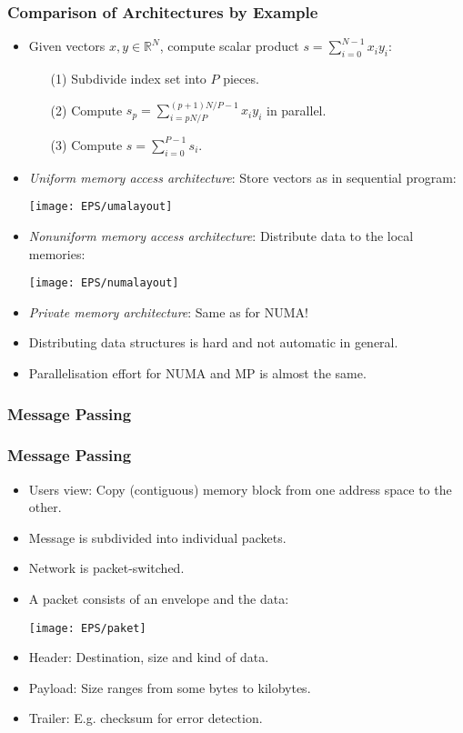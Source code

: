 \begin{frame}
\frametitle{Comparison of Architectures by Example}
\begin{itemize}
\item Given vectors $x,y\in\mathbb{R}^N$, compute scalar product $s =
  \sum_{i=0}^{N-1} x_i y_i$:
\begin{itemize}
\item[(1)] Subdivide index set into $P$ pieces.
\item[(2)] Compute $s_p=\sum_{i=pN/P}^{(p+1)N/P-1} x_i y_i$ in
  parallel.
\item[(3)] Compute $s = \sum_{i=0}^{P-1} s_i$.
\end{itemize}
\item \textit{Uniform memory access architecture}: Store vectors as in
  sequential program:
\begin{center}
  \texttt{[image: EPS/umalayout]}
\end{center}
\item \textit{Nonuniform memory access architecture}: Distribute
  data to the local memories:
\begin{center}
  \texttt{[image: EPS/numalayout]}
\end{center}
\item \textit{Private memory architecture}: Same as for NUMA!
\item Distributing data structures is hard and not automatic in
  general.
\item Parallelisation effort for NUMA and MP is almost the same.
\end{itemize}
\end{frame}


\subsubsection{Message Passing}
\begin{frame}
\frametitle<presentation>{Message Passing}

\begin{itemize}
\item Users view: Copy (contiguous) memory block from one address space to the
  other.
\item Message is subdivided into individual packets.
\item Network is packet-switched.
\item A packet consists of an envelope and
  the data:
\begin{center}
  \texttt{[image: EPS/paket]}
\end{center}
\item Header: Destination, size and kind of data.
\item Payload: Size ranges from some bytes to kilobytes.
\item Trailer: E.g. checksum for error detection.
\end{itemize}
\end{frame}

